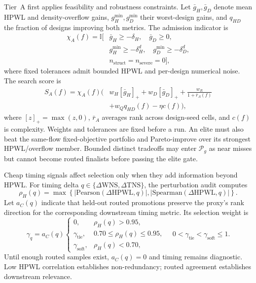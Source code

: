 Tier~A first applies feasibility and robustness constraints. Let
$\bar g_H,\bar g_D$ denote mean HPWL and density-overflow gains,
$g_H^{\min},g_D^{\min}$ their worst-design gains, and $q_{HD}$ the fraction of
designs improving both metrics. The admission indicator is
\begin{equation}
\begin{aligned}
\chi_A(f)=\mathbb{I}\bigl[{}&
\bar g_H\geq-\delta_H,\quad \bar g_D\geq0,\\
&g_H^{\min}\geq-\delta_H^d,\quad
g_D^{\min}\geq-\delta_D^d,\\
&n_{\mathrm{struct}}=n_{\mathrm{severe}}=0\bigr],
\end{aligned}
\label{eq:parent-gate}
\end{equation}
where fixed tolerances admit bounded HPWL and per-design numerical noise. The
search score is
\begin{equation}
\begin{aligned}
S_A(f)=\chi_A(f)\biggl(&w_H[\bar g_H]_+ +w_D[\bar g_D]_+
+\frac{w_R}{1+\bar r_A(f)}\\
&+w_Qq_{HD}(f)-\eta c(f)\biggr),
\end{aligned}
\label{eq:selection-score}
\end{equation}
where $[z]_+=\max(z,0)$, $\bar r_A$ averages rank across design-seed cells, and
$c(f)$ is complexity. Weights and tolerances are fixed before a run. An elite
must also beat the same-flow fixed-objective portfolio and Pareto-improve over
its strongest HPWL/overflow member. Bounded distinct tradeoffs may enter
$\mathcal{P}_g$ as near misses but cannot become routed finalists before
passing the elite gate.

Cheap timing signals affect selection only when they add information beyond
HPWL. For timing delta $q\in\{\Delta\mathrm{WNS},\Delta\mathrm{TNS}\}$, the
perturbation audit computes
\begin{equation}
\rho_H(q)=\max\left\{
|\mathrm{Pearson}(\Delta\mathrm{HPWL},q)|,
|\mathrm{Spearman}(\Delta\mathrm{HPWL},q)|\right\}.
\label{eq:proxy-correlation}
\end{equation}
Let $a_C(q)$ indicate that held-out routed promotions preserve the proxy's rank
direction for the corresponding downstream timing metric. Its selection weight
is
\begin{equation}
\gamma_q=a_C(q)
\begin{cases}
0, & \rho_H(q)>0.95,\\
\gamma_{\mathrm{tie}}, & 0.70\leq\rho_H(q)\leq0.95,\\
\gamma_{\mathrm{soft}}, & \rho_H(q)<0.70,
\end{cases}
\quad 0<\gamma_{\mathrm{tie}}<\gamma_{\mathrm{soft}}\leq1.
\label{eq:proxy-admission}
\end{equation}
Until enough routed samples exist, $a_C(q)=0$ and timing remains diagnostic.
Low HPWL correlation establishes non-redundancy; routed agreement establishes
downstream relevance.

